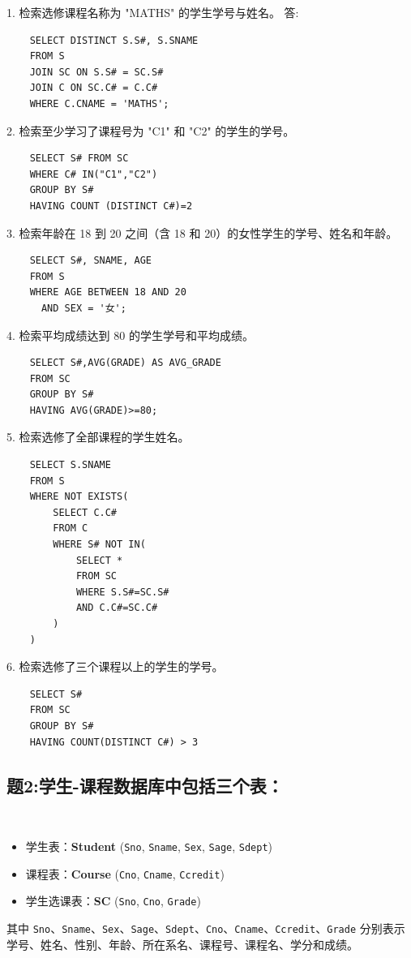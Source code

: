 \documentclass[a4paper,12pt,UTF8]{ctexart}
\begin{document}
1. 检索选修课程名称为 "MATHS" 的学生学号与姓名。
答:\begin{lstlisting}
    SELECT DISTINCT S.S#, S.SNAME
    FROM S
    JOIN SC ON S.S# = SC.S#
    JOIN C ON SC.C# = C.C#
    WHERE C.CNAME = 'MATHS';
\end{lstlisting}
2. 检索至少学习了课程号为 "C1" 和 "C2" 的学生的学号。
\begin{lstlisting}
    SELECT S# FROM SC
    WHERE C# IN("C1","C2")
    GROUP BY S#
    HAVING COUNT (DISTINCT C#)=2
\end{lstlisting}
3. 检索年龄在 18 到 20 之间（含 18 和 20）的女性学生的学号、姓名和年龄。
\begin{lstlisting}
    SELECT S#, SNAME, AGE
    FROM S
    WHERE AGE BETWEEN 18 AND 20
      AND SEX = '女'; 
\end{lstlisting}
4. 检索平均成绩达到 80 的学生学号和平均成绩。
\begin{lstlisting}
    SELECT S#,AVG(GRADE) AS AVG_GRADE
    FROM SC
    GROUP BY S#
    HAVING AVG(GRADE)>=80;
\end{lstlisting}
5. 检索选修了全部课程的学生姓名。
\begin{lstlisting}
    SELECT S.SNAME
    FROM S 
    WHERE NOT EXISTS(
        SELECT C.C#
        FROM C 
        WHERE S# NOT IN(
            SELECT *
            FROM SC
            WHERE S.S#=SC.S#
            AND C.C#=SC.C#
        )
    )
\end{lstlisting}
6. 检索选修了三个课程以上的学生的学号。
\begin{lstlisting}
    SELECT S#
    FROM SC
    GROUP BY S#
    HAVING COUNT(DISTINCT C#) > 3 
\end{lstlisting}
\subsection{题2:学生-课程数据库中包括三个表：}\\
\begin{itemize}
    \item 学生表：\textbf{Student} (\texttt{Sno}, \texttt{Sname}, \texttt{Sex}, \texttt{Sage}, \texttt{Sdept})
    \item 课程表：\textbf{Course} (\texttt{Cno}, \texttt{Cname}, \texttt{Ccredit})
    \item 学生选课表：\textbf{SC} (\texttt{Sno}, \texttt{Cno}, \texttt{Grade})
\end{itemize}

其中 \texttt{Sno}、\texttt{Sname}、\texttt{Sex}、\texttt{Sage}、\texttt{Sdept}、\texttt{Cno}、\texttt{Cname}、\texttt{Ccredit}、\texttt{Grade} 分别表示学号、姓名、性别、年龄、所在系名、课程号、课程名、学分和成绩。
\end{document}
